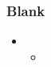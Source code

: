 \begin{frame}[fragile]
%
  \frametitle{Blank}
%
  \begin{itemize}
%
  \item 
    \begin{itemize}
      \item
    \end{itemize}
%
  \end{itemize}
%
\end{frame}

